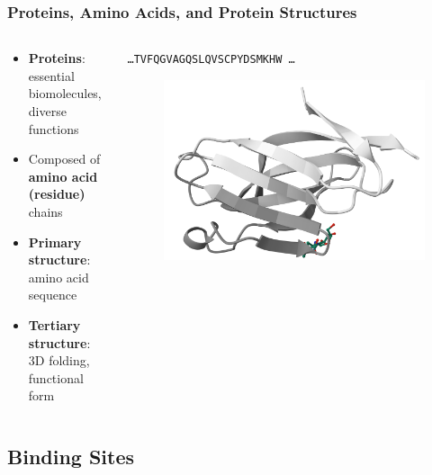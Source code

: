 \documentclass[aspectratio=169]{beamer}
\begin{document}
\begin{frame}
  \frametitle{Proteins, Amino Acids, and Protein Structures}

  \begin{columns}
    \begin{column}{0.5\textwidth}
      \begin{itemize}
        \item \textbf{Proteins}: essential biomolecules, diverse functions
        \item Composed of \textbf{amino acid (residue)} chains
        \item \textbf{Primary structure}: amino acid sequence
        \item \textbf{Tertiary structure}: 3D folding, functional form
      \end{itemize}
    \end{column}
    \begin{column}{0.5\textwidth}
      \texttt{\dots TVFQGVAGQSLQVSCPYDSMKHW \dots}
      \begin{figure}
        \includegraphics[width=\textwidth]{fig/5eli_no_color.png}
      \end{figure}
    \end{column}
  \end{columns}

\end{frame}

\subsection{Binding Sites}
\end{document}
